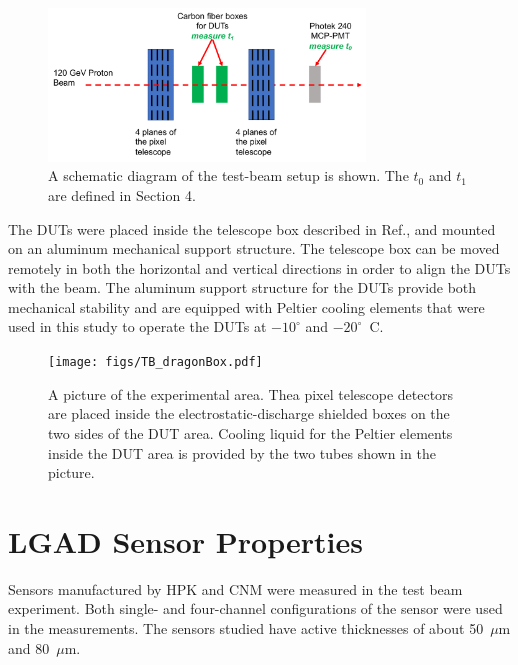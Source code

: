 \documentclass[preprint,1p]{elsarticle}
\begin{document}
\begin{figure}[htbp] 
\centering
\includegraphics[width=0.75\textwidth]{figs/BeamSetup.pdf} 
\caption{A schematic diagram of the test-beam setup is shown. The $t_0$ and $t_1$ are defined in Section 4.} 
\label{fig:DragonBoxDiagram} 
\end{figure} 

The DUTs were placed inside the telescope box described in
Ref.\cite{KWAN2016162}, and mounted on an aluminum mechanical support structure.
The telescope box can be moved remotely in both the horizontal and vertical
directions in order to align the DUTs with the beam. The aluminum support
structure for the DUTs provide both mechanical stability and are
equipped with Peltier cooling elements that were used in this study to operate
the DUTs at $-10^{\circ}$ and $-20^{\circ}$~C.

\begin{figure}[htbp] 
\centering
\texttt{[image: figs/TB\_dragonBox.pdf]} 
\caption{A picture of the experimental area. Thea pixel telescope detectors are placed inside the 
electrostatic-discharge shielded boxes on the two sides of the DUT area. Cooling liquid for 
the Peltier elements inside the DUT area is provided by the two tubes shown in the picture.} 
\label{fig:DragonBox} 
\end{figure} 


\section{LGAD Sensor Properties}
\label{sec:sensors}

Sensors manufactured by HPK and CNM were measured in the test beam
experiment. Both single- and four-channel configurations of the sensor were used
in the measurements. The sensors studied have active thicknesses of
about 50~$\mu$m and 80~$\mu$m. 

\end{document}
